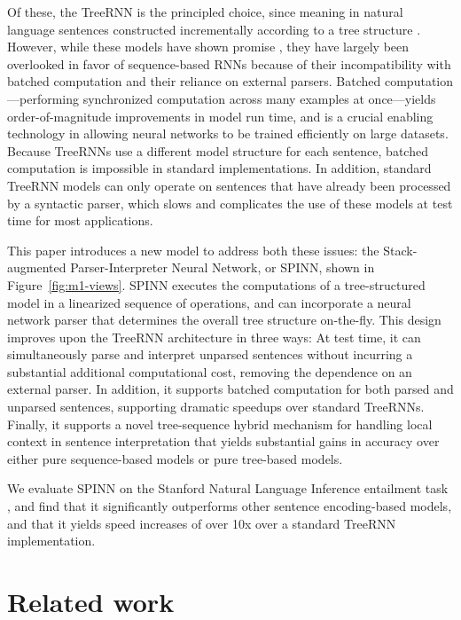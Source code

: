 \documentclass[11pt]{article}
\begin{document}
Of these, the TreeRNN is the principled choice, since meaning in natural language sentences constructed incrementally according to a tree structure \citep[][i.a.]{Szabolcsi:2009}. However, while these models have shown promise \citep{tai2015improved,li2015tree,bowman2015trees}, they have largely been overlooked in favor of sequence-based RNNs because of their incompatibility with batched computation and their reliance on external parsers.  Batched computation---performing synchronized computation across many examples at once---yields order-of-magnitude improvements in model run time, and is a crucial enabling technology in allowing neural networks to be trained efficiently on large datasets. Because TreeRNNs use a different model structure for each sentence, batched computation is impossible in standard implementations. In addition, standard TreeRNN models can only operate on sentences that have already been processed by a syntactic parser, which slows and complicates the use of these models at test time for most applications.

This paper introduces a new model to address both these issues: the Stack-augmented Parser-Interpreter Neural Network, or SPINN, shown in Figure~\ref{fig:m1-views}. SPINN executes the computations of a tree-structured model in a linearized sequence of operations, and can incorporate a neural network parser that determines the overall tree structure on-the-fly. This design improves upon the TreeRNN architecture in three ways: At test time, it can simultaneously parse and interpret unparsed sentences without incurring a substantial additional computational cost, removing the dependence on an external parser. In addition, it supports batched computation for both parsed and unparsed sentences, supporting dramatic speedups over standard TreeRNNs. Finally, it supports a novel tree-sequence hybrid mechanism for handling local context in sentence interpretation that yields substantial gains in accuracy over either pure sequence-based models or pure tree-based models.

We evaluate SPINN on the Stanford Natural Language Inference entailment task \citep[SNLI,][]{snli:emnlp2015}, and find that it significantly outperforms other sentence encoding-based models, and that it yields speed increases of over 10x over a standard TreeRNN implementation.

\section{Related work}
\end{document}
